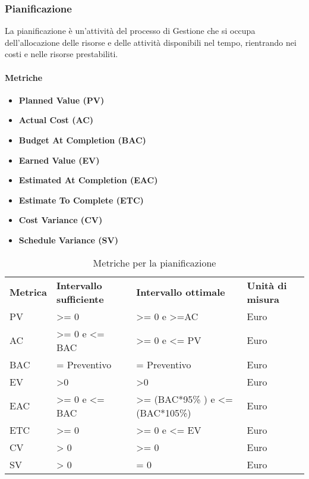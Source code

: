\subsubsection{Pianificazione}
La pianificazione è un'attività del processo di Gestione che si occupa dell'allocazione delle risorse e delle attività disponibili nel tempo, rientrando nei costi e nelle risorse prestabiliti.
\paragraph{Metriche}
\begin{itemize}
	\item \textbf{Planned Value (PV)}
	\item \textbf{Actual Cost (AC)}
	\item \textbf{Budget At Completion (BAC)}
	\item \textbf{Earned Value (EV)}
	\item \textbf{Estimated At Completion (EAC)}
	\item \textbf{Estimate To Complete (ETC)}
	\item \textbf{Cost Variance	(CV)}
	\item \textbf{Schedule Variance	(SV)}
\end{itemize}

\renewcommand{\arraystretch}{2.2}
\begin{longtable}{|C{2cm}|C{3.5cm}|C{3.5cm}|C{3cm}|}

	\caption{Metriche per la pianificazione }\\
	\hline

	\textbf{Metrica} & \textbf{Intervallo sufficiente}  & \textbf{Intervallo ottimale} & \textbf{Unità di misura}
	\tabularnewline
	\endfirsthead

	PV & >= 0 & >= 0 e >=AC & Euro \\
	AC & >= 0 e <= BAC & >= 0 e <= PV & Euro \\
	BAC & = Preventivo  & = Preventivo & Euro \\
	EV & >0  & >0 & Euro \\
	EAC &  >= 0 e <= BAC& >= (BAC*95\% ) e <= (BAC*105\%)& Euro \\
	ETC & >= 0 & >= 0 e <= EV & Euro \\
	CV & > 0 & >= 0 & Euro \\
	SV & > 0 & = 0 & Euro \\
\end{longtable}
